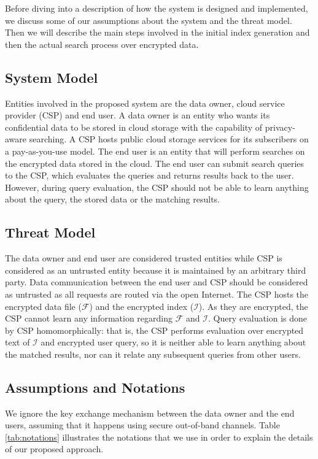 Before diving into a description of how the system
is designed and implemented, we discuss some of our assumptions
about the system and the threat model. Then we will describe the main
steps involved in the initial index generation
and then the actual search process over encrypted data.

\subsection{System Model}

Entities involved in the proposed system are the data owner, cloud service provider (CSP) and end user.
A data owner is an entity who wants its confidential data to be stored in cloud storage with the capability of privacy-aware searching. 
A CSP hosts public cloud storage services for its subscribers on 
a pay-as-you-use model. The end user is an entity that will perform searches on the 
encrypted data stored in the cloud. The end user can submit search queries 
to the CSP, which evaluates the queries and returns results back to the user. 
However, during query evaluation, the CSP should not be able to learn anything about the query, 
the stored data or the matching results.

\subsection{Threat Model}

The data owner and end user are considered trusted entities while CSP 
is considered as an untrusted entity because it is maintained by an 
arbitrary third party. Data communication between the end user and CSP should 
be considered as untrusted as all requests are routed via the open Internet. 
The CSP hosts the encrypted data file ($\mathcal{F}$) and the encrypted index ($\mathcal{I}$). 
As they are encrypted, the CSP cannot learn any information regarding $\mathcal{F}$ and $\mathcal{I}$. 
Query evaluation is done by CSP homomorphically: that is, the CSP performs 
evaluation over encrypted text of $\mathcal{I}$ and encrypted user query, 
so it is neither able to learn anything about the matched results, nor
can it relate any subsequent queries from other users. 

\subsection{Assumptions and Notations}

We ignore the key exchange mechanism between the data owner and the end users, assuming
that it happens using secure out-of-band channels.
Table \ref{tab:notations} illustrates the notations that we use in order to explain
the details of our proposed approach.


